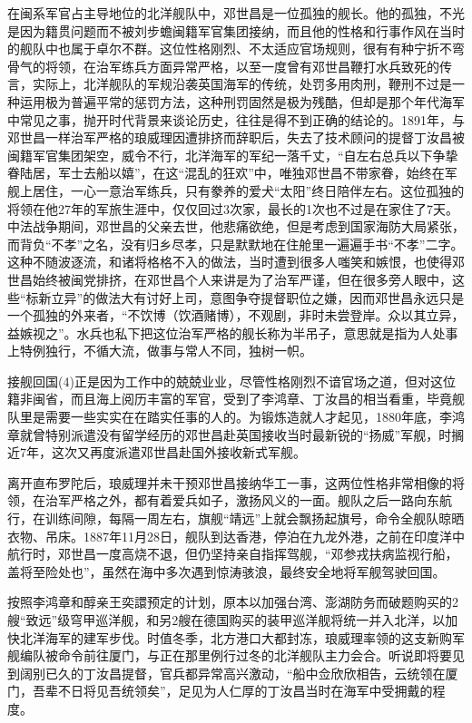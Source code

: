 \documentclass[12pt,UTF8]{ctexbook}
\begin{document}
在闽系军官占主导地位的北洋舰队中，邓世昌是一位孤独的舰长。他的孤独，不光是因为籍贯问题而不被刘步蟾闽籍军官集团接纳，而且他的性格和行事作风在当时的舰队中也属于卓尔不群。这位性格刚烈、不太适应官场规则，很有有种宁折不弯骨气的将领，在治军练兵方面异常严格，以至一度曾有邓世昌鞭打水兵致死的传言，实际上，北洋舰队的军规沿袭英国海军的传统，处罚多用肉刑，鞭刑不过是一种运用极为普遍平常的惩罚方法，这种刑罚固然是极为残酷，但却是那个年代海军中常见之事，抛开时代背景来谈论历史，往往是得不到正确的结论的。1891年，与邓世昌一样治军严格的琅威理因遭排挤而辞职后，失去了技术顾问的提督丁汝昌被闽籍军官集团架空，威令不行，北洋海军的军纪一落千丈，“自左右总兵以下争挚眷陆居，军士去船以嬉”，在这“混乱的狂欢”中，唯独邓世昌不带家眷，始终在军舰上居住，一心一意治军练兵，只有豢养的爱犬“太阳”终日陪伴左右。这位孤独的将领在他27年的军旅生涯中，仅仅回过3次家，最长的1次也不过是在家住了7天。中法战争期间，邓世昌的父亲去世，他悲痛欲绝，但是考虑到国家海防大局紧张，而背负“不孝”之名，没有归乡尽孝，只是默默地在住舱里一遍遍手书“不孝”二字。这种不随波逐流，和诸将格格不入的做法，当时遭到很多人嗤笑和嫉恨，也使得邓世昌始终被闽党排挤，在邓世昌个人来讲是为了治军严谨，但在很多旁人眼中，这些“标新立异”的做法大有讨好上司，意图争夺提督职位之嫌，因而邓世昌永远只是一个孤独的外来者，“不饮博（饮酒赌博），不观剧，非时未尝登岸。众以其立异，益嫉视之”。水兵也私下把这位治军严格的舰长称为半吊子，意思就是指为人处事上特例独行，不循大流，做事与常人不同，独树一帜。

接舰回国(4)正是因为工作中的兢兢业业，尽管性格刚烈不谙官场之道，但对这位籍非闽省，而且海上阅历丰富的军官，受到了李鸿章、丁汝昌的相当看重，毕竟舰队里是需要一些实实在在踏实任事的人的。为锻炼造就人才起见，1880年底，李鸿章就曾特别派遣没有留学经历的邓世昌赴英国接收当时最新锐的“扬威”军舰，时搁近7年，这次又再度派遣邓世昌赴国外接收新式军舰。

离开直布罗陀后，琅威理并未干预邓世昌接纳华工一事，这两位性格非常相像的将领，在治军严格之外，都有着爱兵如子，激扬风义的一面。舰队之后一路向东航行，在训练间隙，每隔一周左右，旗舰“靖远”上就会飘扬起旗号，命令全舰队晾晒衣物、吊床。1887年11月28日，舰队到达香港，停泊在九龙外港，之前在印度洋中航行时，邓世昌一度高烧不退，但仍坚持亲自指挥驾舰，“邓参戎扶病监视行船，盖将至险处也”，虽然在海中多次遇到惊涛骇浪，最终安全地将军舰驾驶回国。

按照李鸿章和醇亲王奕譞预定的计划，原本以加强台湾、澎湖防务而破题购买的2艘“致远”级穹甲巡洋舰，和另2艘在德国购买的装甲巡洋舰将统一并入北洋，以加快北洋海军的建军步伐。时值冬季，北方港口大都封冻，琅威理率领的这支新购军舰编队被命令前往厦门，与正在那里例行过冬的北洋舰队主力会合。听说即将要见到阔别已久的丁汝昌提督，官兵都异常高兴激动，“船中佥欣欣相告，云统领在厦门，吾辈不日将见吾统领矣”，足见为人仁厚的丁汝昌当时在海军中受拥戴的程度。
\end{document}
